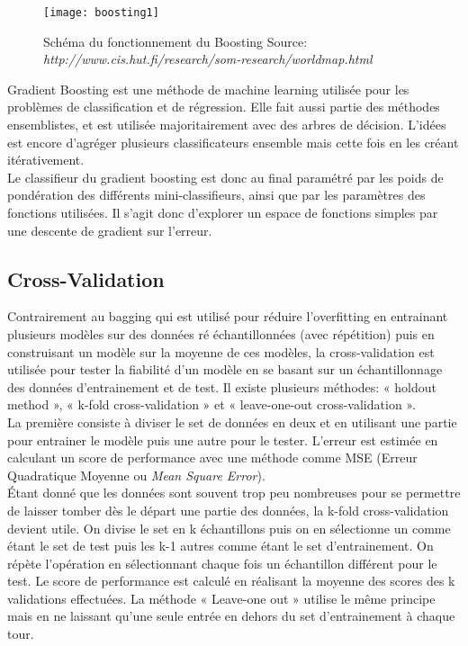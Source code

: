 \begin{figure}[H]
	\texttt{[image: boosting1]}
	\caption{\label{BoostingSchema}Schéma du fonctionnement du Boosting \newline Source: \textit{http://www.cis.hut.fi/research/som-research/worldmap.html}}
\end{figure}

\noindent Gradient Boosting est une méthode de machine learning utilisée pour les problèmes de classification et de régression. Elle fait aussi partie des méthodes ensemblistes, et est utilisée majoritairement avec des arbres de décision. L'idées est encore d'agréger plusieurs classificateurs ensemble mais cette fois en les créant itérativement.\\


\noindent Le classifieur du gradient boosting est donc au final paramétré par les poids de pondération des différents mini-classifieurs, ainsi que par les paramètres des fonctions utilisées. Il s’agit donc d’explorer un espace de fonctions simples par une descente de gradient sur l’erreur\cite{EnsembleMethods}.

\subsection{Cross-Validation}

Contrairement au bagging qui est utilisé pour réduire l'overfitting en entrainant plusieurs modèles sur des données ré échantillonnées (avec répétition) puis en construisant un modèle sur la moyenne de ces modèles, la cross-validation est utilisée pour tester la fiabilité d'un modèle en se basant sur un échantillonnage des données d'entrainement et de test. Il existe plusieurs méthodes: « holdout method », « k-fold cross-validation » et « leave-one-out cross-validation ».\\

\noindent La première consiste à diviser le set de données en deux et en utilisant une partie pour entrainer le modèle puis une autre pour le tester. L'erreur est estimée en calculant un score de performance avec une méthode comme MSE (Erreur Quadratique Moyenne ou \textit{Mean Square Error}). \\

\noindent Étant donné que les données sont souvent trop peu nombreuses pour se permettre de laisser tomber dès le départ une partie des données, la k-fold cross-validation devient utile. On divise le set en k échantillons puis on en sélectionne un comme étant le set de test puis les k-1 autres comme étant le set d'entrainement. On répète l'opération en sélectionnant chaque fois un échantillon différent pour le test. Le score de performance est calculé en réalisant la moyenne des scores des k validations effectuées. La méthode « Leave-one out » utilise le même principe mais en ne laissant qu'une seule entrée en dehors du set d'entrainement à chaque tour\cite{hastie_09_elements-of.statistical-learning}. 


